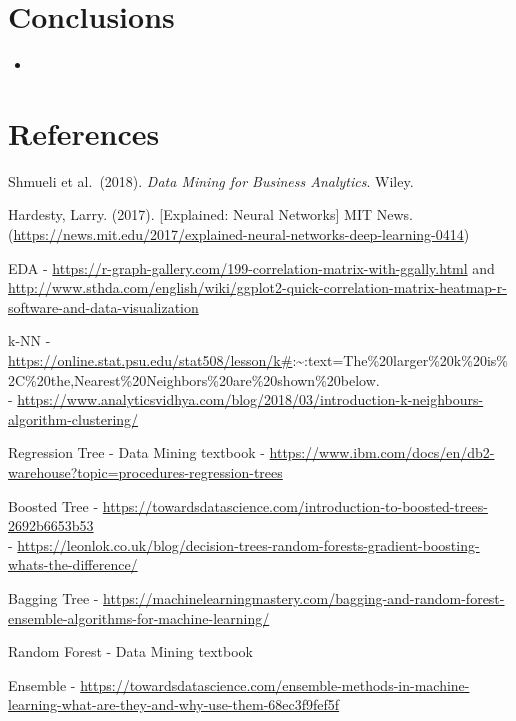 \documentclass[
  paper=a4,
  ,captions=tableheading
]{scrartcl}
\providecommand{\tightlist}{%
  \setlength{\itemsep}{0pt}\setlength{\parskip}{0pt}}
\begin{document}
\hypertarget{conclusions}{%
\section{Conclusions}\label{conclusions}}

\begin{itemize}
\tightlist
\item
\end{itemize}

\hypertarget{references}{%
\section{References}\label{references}}

Shmueli et al.~(2018). \emph{Data Mining for Business Analytics}. Wiley.

Hardesty, Larry. (2017). {[}Explained: Neural Networks{]} MIT News.
(\url{https://news.mit.edu/2017/explained-neural-networks-deep-learning-0414})

EDA -
\url{https://r-graph-gallery.com/199-correlation-matrix-with-ggally.html}
and
\url{http://www.sthda.com/english/wiki/ggplot2-quick-correlation-matrix-heatmap-r-software-and-data-visualization}

k-NN -
\url{https://online.stat.psu.edu/stat508/lesson/k\#}:\textasciitilde:text=The\%20larger\%20k\%20is\%2C\%20the,Nearest\%20Neighbors\%20are\%20shown\%20below.\\
-
\url{https://www.analyticsvidhya.com/blog/2018/03/introduction-k-neighbours-algorithm-clustering/}

Regression Tree - Data Mining textbook -
\url{https://www.ibm.com/docs/en/db2-warehouse?topic=procedures-regression-trees}

Boosted Tree -
\url{https://towardsdatascience.com/introduction-to-boosted-trees-2692b6653b53}\\
-
\url{https://leonlok.co.uk/blog/decision-trees-random-forests-gradient-boosting-whats-the-difference/}

Bagging Tree -
\url{https://machinelearningmastery.com/bagging-and-random-forest-ensemble-algorithms-for-machine-learning/}

Random Forest - Data Mining textbook

Ensemble -
\url{https://towardsdatascience.com/ensemble-methods-in-machine-learning-what-are-they-and-why-use-them-68ec3f9fef5f}
\end{document}
